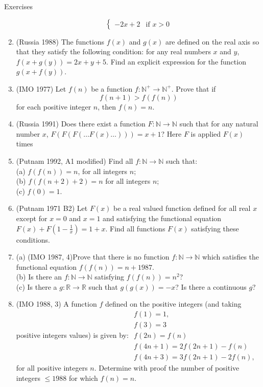 \begin{xcb}{Exercises}
\begin{enumerate}
\[\begin{cases}
    -2x + 2 & \text{if } x > 0
\end{cases}
\]
\item (Russia 1988) The functions $f (x)$ and $g(x)$ are defined on the real axis so that they satisfy the following condition: for any real numbers $x$ and $y$, $f (x + g(y)) = 2x + y + 5$. Find an explicit expression for the function $g(x + f (y))$.
\item (IMO 1977) Let $f(n)$ be a function $f: \mathbb{N}^{+}\to\mathbb{N}^{+}$. Prove that if\[f(n+1) > f(f(n))\]for each positive integer $n$, then $f(n)=n$.
\item  (Russia 1991) Does there exist a function $F : \mathbb{N} \to \mathbb{N}$ such that for any natural number $x$,
$F (F (F ( \dots F (x) \dots))) = x + 1 $? Here $F$ is applied $F (x)$ times\\
\item (Putnam 1992, A1 modified) Find all $f: \mathbb{N} \to \mathbb{N}$ such that:\\
(a) $f(f(n)) = n$, for all integers $n$;\\
(b) $f(f(n + 2) + 2) = n$ for all integers $n$;\\
(c) $f(0) = 1$.
\item (Putnam 1971 B2) Let $F(x)$ be a real valued function defined for all real $x$ except for $x = 0$ and
$x = 1$ and satisfying the functional equation $F(x) + F(1-\frac{1}{x}) = 1 + x$. Find all functions $F(x)$ satisfying these conditions.
\item (a) (IMO 1987, 4)Prove that there is no function $f : \mathbb{N} \to \mathbb{N}$ which satisfies the functional equation $f(f(n)) = n + 1987$.\\
(b) Is there an $f : \mathbb{N} \to \mathbb{N}$ satisfying $f(f(n)) = n^2$?\\
(c) Is there a $g : \mathbb{R} \to \mathbb{R}$ such that $g(g(x)) = -x$? Is there a continuous $g$?
\item (IMO 1988, 3) A function $f$ defined on the positive integers (and taking positive integers values) is given by:
$\begin{matrix} f(1) = 1,\\ f(3) = 3 \\ f(2n) = f(n) \\ f(4n + 1) = 2f(2n + 1) - f(n) \\ f(4n + 3) = 3f(2n + 1) - 2f(n), \end{matrix}$
for all positive integers $n.$ Determine with proof the number of positive integers $\leq 1988$ for which $f(n) = n.$


\end{enumerate}
\end{xcb}
